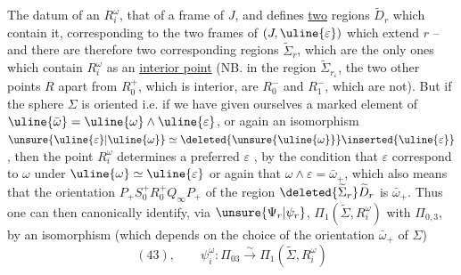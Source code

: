 The datum of an $R_i^\omega$,  that of a frame  of $J$, and defines \uline{two}  regions $\widetilde D_r$ which contain it, corresponding to the two frames of $(J,\uline{\varepsilon})$ which extend $r$ -- and there are therefore two corresponding regions $\widetilde\Sigma_r$, which are the only ones which contain $R_i^\omega$ as an \uline{interior point} (NB. in the  region $\widetilde\Sigma_{r_\varepsilon}$, the two other points $R$ apart from $R_0^+$, which is interior, are $R_0^-$ and $R_1^-$, which are not). But if the sphere $\Sigma$ is oriented i.e. if we have given ourselves a marked element \inserted{$\bar\omega_+$} of $\uline{\bar\omega}=\uline{\omega}\wedge\uline{\varepsilon}$, or again an isomorphism $\unsure{\uline{\varepsilon}|\uline{\omega}}\simeq\deleted{\unsure{\uline{\omega}}}\inserted{\uline{\varepsilon}}$, then the point $R_i^\omega$ determines a preferred $\varepsilon$ \inserted{$\in\uline{\varepsilon}$}, by the condition that $\varepsilon$ correspond to $\omega$ under $\uline{\omega}\simeq\uline{\varepsilon}$ or again that $\omega\wedge\varepsilon=\bar\omega_+$, which also means that the orientation $P_+S_0^+R_0^+Q_\infty P_+$ of the region $\deleted{\widetilde\Sigma_r}\widetilde D_r$ is  $\bar\omega_+$. Thus one can then canonically identify, via $\unsure{\Psi_r|\psi_r}$, $\Pi_1(\widetilde\Sigma,R_i^\omega)$ with $\Pi_{0,3}$, by an isomorphism (which depends on the choice of the orientation $\bar\omega_+$ of $\Sigma$)
\[
(43),\qquad\psi_i^\omega:\Pi_{03}\xrightarrow{\sim}\Pi_1(\widetilde\Sigma,R_i^\omega)
\]
